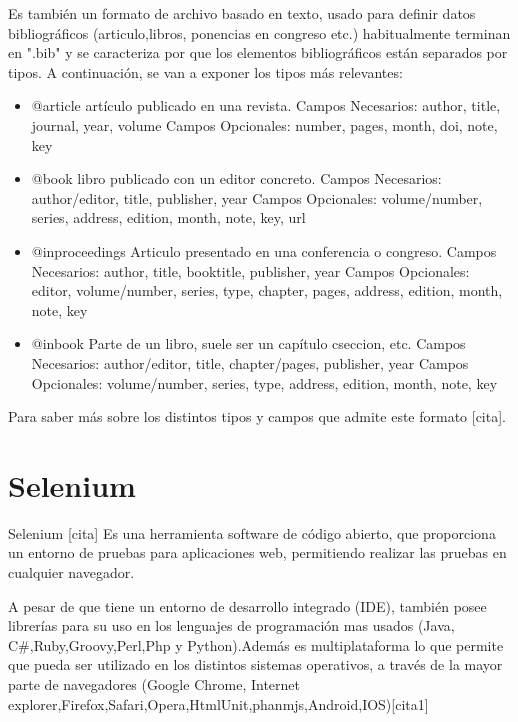 Es también un formato de archivo basado en texto, usado para definir datos bibliográficos (articulo,libros, ponencias en congreso etc.) habitualmente terminan en ".bib" y se caracteriza por que los elementos bibliográficos están separados por tipos. A continuación, se van a exponer los tipos más relevantes:
\begin{itemize}
	\item @article
		artículo publicado en una revista.
		Campos Necesarios: author, title, journal, year, volume
		Campos Opcionales: number, pages, month, doi, note, key
	\item @book
		libro publicado con un editor concreto.
		Campos Necesarios: author/editor, title, publisher, year
		Campos Opcionales: volume/number, series, address, edition, month, note, key, url
	\item @inproceedings
		Articulo presentado en una conferencia o congreso.
		Campos Necesarios: author, title, booktitle, publisher, year
		Campos Opcionales: editor, volume/number, series, type, chapter, pages, address, edition, month, note, key
	\item @inbook
		Parte de un libro, suele ser un capítulo cseccion, etc.
		Campos Necesarios: author/editor, title, chapter/pages, publisher, year
		Campos Opcionales: volume/number, series, type, address, edition, month, note, key
		
	 
\end{itemize}

Para saber más sobre los distintos tipos y campos que admite este formato [cita].

\section{Selenium}

Selenium [cita] Es una herramienta software de código abierto, que proporciona un entorno de pruebas para aplicaciones web, permitiendo realizar las pruebas en cualquier navegador.

A pesar de que tiene un entorno de desarrollo integrado (IDE), también posee librerías para su uso en los lenguajes de programación mas usados (Java, C\#,Ruby,Groovy,Perl,Php y Python).Además es multiplataforma lo  que permite que pueda ser utilizado en los distintos sistemas operativos, a través de la mayor parte de navegadores (Google Chrome, Internet explorer,Firefox,Safari,Opera,HtmlUnit,phanmjs,Android,IOS)[cita1]

